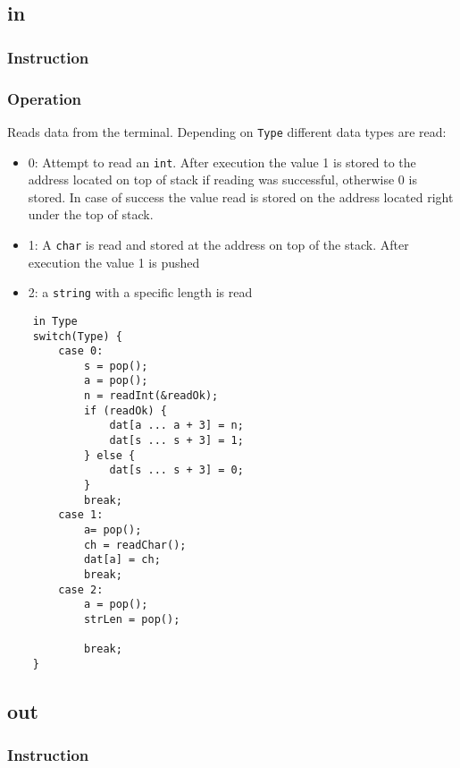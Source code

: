 \subsection{in}\label{sec:in}
\subsubsection{Instruction}

\subsubsection{Operation}
Reads data from the terminal. Depending on \lstinline$Type$ different data types are read:

\begin{itemize}
	\item 0: Attempt to read an \lstinline$int$. After execution the value 1 is stored to the address located on top of stack if reading was successful, otherwise 0 is stored. In case of success the value read is stored on the address located right under the top of stack.
	\item 1: A \lstinline$char$ is read and stored at the address on top of the stack. After execution the value 1 is pushed 
	\item 2: a \lstinline$string$ with a specific length is read
\end{itemize}

	\begin{lstlisting}
	in Type
	switch(Type) {
		case 0:
			s = pop();
			a = pop();
			n = readInt(&readOk);
			if (readOk) {
				dat[a ... a + 3] = n;
				dat[s ... s + 3] = 1;
			} else {
				dat[s ... s + 3] = 0;
			}
			break;
		case 1:
			a= pop();
			ch = readChar();
			dat[a] = ch;
			break;
		case 2:
			a = pop();
			strLen = pop();
			
			break;
	}
	\end{lstlisting}

\subsection{out}\label{sec:out}
\subsubsection{Instruction}

